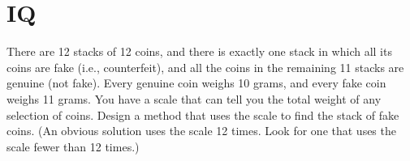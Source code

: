 \documentclass{article}
\begin{document}
\section{IQ}

\noindent There are 12 stacks of 12 coins, and there is exactly one stack in which all its coins are fake (i.e., counterfeit), and all the coins in the remaining 11 stacks are genuine (not fake). Every genuine coin weighs 10 grams, and every fake coin weighs 11 grams. You have a  scale that can tell you the total weight of any selection of coins. Design a method that uses  the scale to find the stack of fake coins. (An obvious solution uses the scale 12 times. Look  for one that uses the scale fewer than 12 times.)
\end{document}
